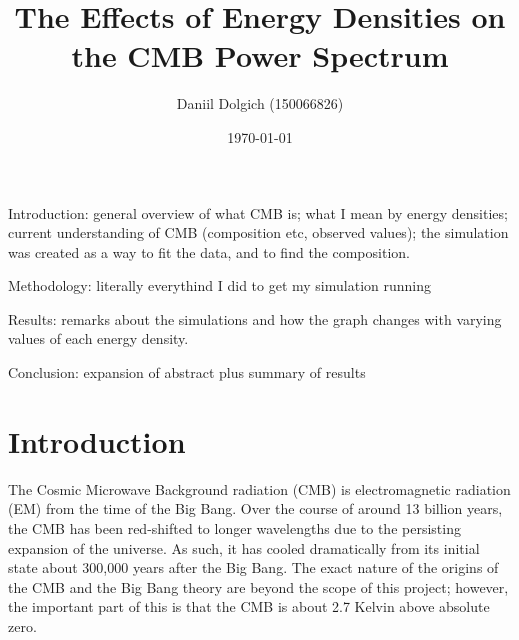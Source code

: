 \documentclass[twoside, fontsize=12pt,
     bibliography=totoc, %
     listof=totoc, %
     index=totoc, %
     onehalfspacing %
]{_MScDiss2017_cls}
\title{The Effects of Energy Densities on the CMB Power Spectrum}
\author{Daniil Dolgich (150066826)}
\date{\today}
\begin{document}
\setcounter{tocdepth}{5}

\maketitle
{}
\tableofcontents %
\listoffigures %
\listoftables %
Introduction: general overview of what CMB is; what I mean by energy densities; current understanding of CMB (composition etc, observed values); the simulation was created as a way to fit the data, and to find the composition.


Methodology: literally everythind I did to get my simulation running


Results: remarks about the simulations and how the graph changes with varying values of each energy density.


Conclusion: expansion of abstract plus summary of results

\newpage%
\cleardoublepage
{}%


\chapter{Introduction}
The Cosmic Microwave Background radiation (CMB) is electromagnetic radiation (EM) from the time of the Big Bang. Over the course of around 13 billion years, the CMB has been red-shifted to longer wavelengths due to the persisting expansion of the universe. As such, it has cooled dramatically from its initial state about 300,000 years after the Big Bang. The exact nature of the origins of the CMB and the Big Bang theory are beyond the scope of this project; however, the important part of this is that the CMB is about 2.7 Kelvin above absolute zero.
\end{document}

